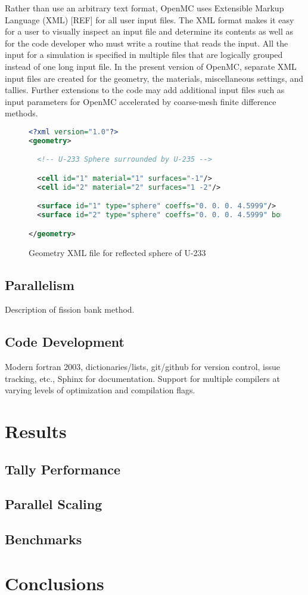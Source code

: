 \documentclass{elsarticle}
\begin{document}
Rather than use an arbitrary text format, OpenMC uses Extensible Markup Language
(XML) [REF] for all user input files. The XML format makes it easy for a user to
visually inspect an input file and determine its contents as well as for the
code developer who must write a routine that reads the input. All the input for
a simulation is specified in multiple files that are logically grouped instead
of one long input file. In the present version of OpenMC, separate XML input
files are created for the geometry, the materials, miscellaneous settings, and
tallies. Further extensions to the code may add additional input files such as
input parameters for OpenMC accelerated by coarse-mesh finite difference
methods.

\begin{figure}
  \begin{lstlisting}[language=xml]
<?xml version="1.0"?>
<geometry>

  <!-- U-233 Sphere surrounded by U-235 -->

  <cell id="1" material="1" surfaces="-1"/>
  <cell id="2" material="2" surfaces="1 -2"/>

  <surface id="1" type="sphere" coeffs="0. 0. 0. 4.5999"/>
  <surface id="2" type="sphere" coeffs="0. 0. 0. 4.5999" boundary="vacuum"/>

</geometry>
  \end{lstlisting}
  \caption{Geometry XML file for reflected sphere of U-233}
  \label{fig:geometry-xml}
\end{figure}

\subsection{Parallelism}

Description of fission bank method.

\subsection{Code Development}

Modern fortran 2003, dictionaries/lists, git/github for version control, issue
tracking, etc., Sphinx for documentation. Support for multiple compilers at
varying levels of optimization and compilation flags.

\section{Results}

\subsection{Tally Performance}

\subsection{Parallel Scaling}

\subsection{Benchmarks}

\section{Conclusions}



\end{document}
